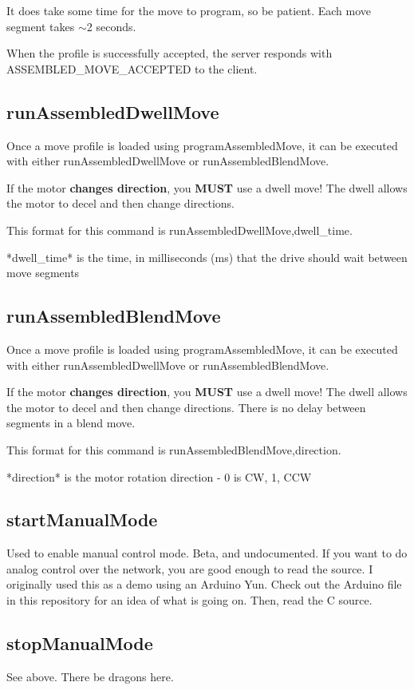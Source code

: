 It does take some time for the move to program, so be patient. Each move segment takes $\sim$2 seconds.

When the profile is successfully accepted, the server responds with {\ttfamily A\+S\+S\+E\+M\+B\+L\+E\+D\+\_\+\+M\+O\+V\+E\+\_\+\+A\+C\+C\+E\+P\+T\+E\+D} to the client.\hypertarget{index_runAssembledDwellMove}{}\subsection{run\+Assembled\+Dwell\+Move}\label{index_runAssembledDwellMove}
Once a move profile is loaded using {\ttfamily program\+Assembled\+Move}, it can be executed with either {\ttfamily run\+Assembled\+Dwell\+Move} or {\ttfamily run\+Assembled\+Blend\+Move}.

If the motor {\bfseries changes direction}, you {\bfseries M\+U\+S\+T} use a dwell move! The dwell allows the motor to decel and then change directions.

This format for this command is {\ttfamily run\+Assembled\+Dwell\+Move,dwell\+\_\+time}. \begin{DoxyVerb}*dwell_time* is the time, in milliseconds (ms) that the drive should wait between move segments
\end{DoxyVerb}
\hypertarget{index_runAssembledBlendMove}{}\subsection{run\+Assembled\+Blend\+Move}\label{index_runAssembledBlendMove}
Once a move profile is loaded using {\ttfamily program\+Assembled\+Move}, it can be executed with either {\ttfamily run\+Assembled\+Dwell\+Move} or {\ttfamily run\+Assembled\+Blend\+Move}.

If the motor {\bfseries changes direction}, you {\bfseries M\+U\+S\+T} use a dwell move! The dwell allows the motor to decel and then change directions. There is no delay between segments in a blend move.

This format for this command is {\ttfamily run\+Assembled\+Blend\+Move,direction}. \begin{DoxyVerb}*direction* is the motor rotation direction - 0 is CW, 1, CCW
\end{DoxyVerb}
\hypertarget{index_startManualMode}{}\subsection{start\+Manual\+Mode}\label{index_startManualMode}
Used to enable manual control mode. Beta, and undocumented. If you want to do analog control over the network, you are good enough to read the source. I originally used this as a demo using an Arduino Yun. Check out the Arduino file in this repository for an idea of what is going on. Then, read the C source.\hypertarget{index_stopManualMode}{}\subsection{stop\+Manual\+Mode}\label{index_stopManualMode}
See above. There be dragons here. 
